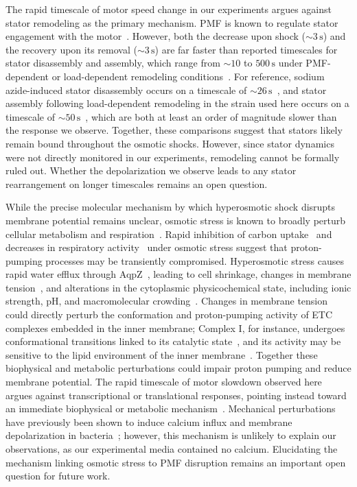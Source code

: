 \documentclass[twocolumn]{biophys-new}%
\begin{document}
The rapid timescale of motor speed change in our experiments argues against stator remodeling as the primary mechanism. PMF is known to regulate stator engagement with the motor~\cite{fung_berg1995,tipping2013quantification}. However, both the decrease upon shock ($\sim 3\,\mathrm{s}$) and the recovery upon its removal ($\sim 3\,\mathrm{s}$) are far faster than reported timescales for stator disassembly and assembly, which range from $\sim10$ to $500\,\mathrm{s}$ under PMF-dependent or load-dependent remodeling conditions~\cite{tipping2013quantification,lele2013,nord2017catch,wadhwaphillipsberg2019,wadhwa2021}. For reference, sodium azide-induced stator disassembly occurs on a timescale of $\sim26\,\mathrm{s}$~\cite{tipping2013quantification}, and stator assembly following load-dependent remodeling in the strain used here occurs on a timescale of $\sim50\,\mathrm{s}$~\cite{wadhwaphillipsberg2019,wadhwa2021}, which are both at least an order of magnitude slower than the response we observe. Together, these comparisons suggest that stators likely remain bound throughout the osmotic shocks. However, since stator dynamics were not directly monitored in our experiments, remodeling cannot be formally ruled out. Whether the depolarization we observe leads to any stator rearrangement on longer timescales remains an open question.

While the precise molecular mechanism by which hyperosmotic shock disrupts membrane potential remains unclear, osmotic stress is known to broadly perturb cellular metabolism and respiration~\cite{roth1985osmotic,HOUSSIN1991,meury1994immediate}. Rapid inhibition of carbon uptake~\cite{roth1985osmotic} and decreases in respiratory activity~\cite{meury1994immediate,HOUSSIN1991} under osmotic stress suggest that proton-pumping processes may be transiently compromised. Hyperosmotic stress causes rapid water efflux through AqpZ~\cite{poolman2002membrane,wood2010,wood2015}, leading to cell shrinkage, changes in membrane tension~\cite{sleator_hill,sun2021}, and alterations in the cytoplasmic physicochemical state, including ionic strength, pH, and macromolecular crowding~\cite{chakraborty2017non,liu2019decreased,sikkema2020gating,poolman2023}. Changes in membrane tension could directly perturb the conformation and proton-pumping activity of ETC complexes embedded in the inner membrane; Complex I, for instance, undergoes conformational transitions linked to its catalytic state~\cite{agip2018}, and its activity may be sensitive to the lipid environment of the inner membrane~\cite{gutierrez2020key,phillips2009}. Together these biophysical and metabolic perturbations could impair proton pumping and reduce membrane potential. The rapid timescale of motor slowdown observed here argues against transcriptional or translational responses, pointing instead toward an immediate biophysical or metabolic mechanism~\cite{poolman2002membrane,weber2006time}. Mechanical perturbations have previously been shown to induce calcium influx and membrane depolarization in bacteria~\cite{bruni2017}; however,
this mechanism is unlikely to explain our observations, as our experimental media contained no calcium. Elucidating the mechanism linking osmotic stress to PMF disruption remains an important open question for future work.
\end{document}
